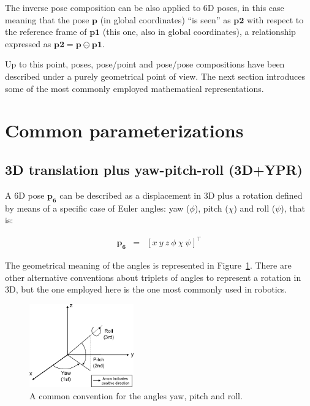 \documentclass[a4paper,10pt]{report}
\begin{document}
The inverse pose composition can be also applied to 6D poses, in this case meaning that
the pose $\mathbf{p}$ (in global coordinates) ``is seen'' as $\mathbf{p2}$ with respect
to the reference frame of $\mathbf{p1}$ (this one, also in global coordinates), a 
relationship expressed as $\mathbf{p2} = \mathbf{p} \ominus \mathbf{p1}$.


Up to this point, poses, pose/point and pose/pose compositions have been described 
under a purely geometrical point of view. 
The next section introduces some of the 
most commonly employed mathematical representations.


\newpage

\section{Common parameterizations}


\subsection{3D translation plus yaw-pitch-roll (3D+YPR)}

A 6D pose $\mathbf{p_6}$ can be described as a displacement in 3D plus a rotation defined by 
means of a specific case of Euler angles: yaw ($\phi$), pitch
($\chi$) and roll ($\psi$), that is:

\begin{eqnarray}
\mathbf{p_6} &=& [x ~ y ~ z ~ \phi ~ \chi ~ \psi]^\top
\end{eqnarray}

The geometrical meaning of the angles is represented in Figure~\ref{fig:ypr}. 
There are other alternative conventions about triplets of angles to represent a rotation in 3D, but
the one employed here is the one most commonly used in robotics. 

\begin{figure}[h]
\centering
\includegraphics[width=0.40\textwidth]{fig1.eps}
\caption{A common convention for the angles yaw, pitch and roll.}
\label{fig:ypr}
\end{figure}
\end{document}
